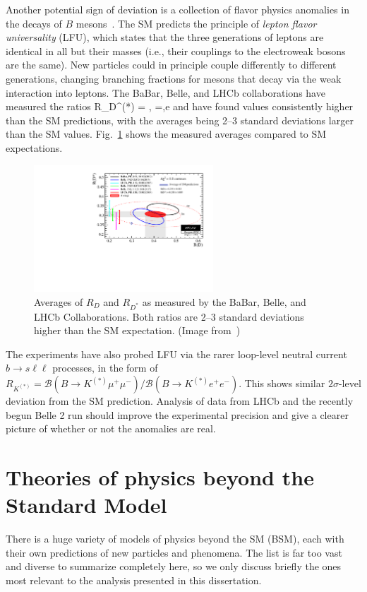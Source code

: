 Another potential sign of deviation is a collection of flavor physics anomalies in the decays of $B$ mesons~\cite{Graverini:flavour}. 
The SM predicts the principle of
\textit{lepton flavor universality} (LFU), which states that the three generations of leptons are identical in all but
their  masses (i.e., their couplings to the electroweak bosons are the same). New particles could in principle
couple differently to different generations, changing branching fractions for mesons that decay via
the weak interaction into leptons. The BaBar, Belle, and LHCb collaborations have measured the ratios
\be
R_{D^{(*)}} = , \;\;\;\;\;
 \ell=\mu,e
\ee
and have found values consistently higher than the SM predictions, with the averages being 2--3 standard deviations
larger than the SM values. Fig.~\ref{fig:b_anomalies} shows the measured averages compared to SM expectations.

\begin{figure}[t]
  \centering
  \includegraphics[width=0.6\textwidth]{figs/theory/b_anomalies.pdf}
  \caption{Averages of $R_D$ and $R_{D^*}$ as measured by the BaBar, Belle, and LHCb Collaborations.
    Both ratios are 2--3 standard deviations higher than the SM expectation. (Image from~\cite{HFLAV})
            }
    \label{fig:b_anomalies}
\end{figure}

The experiments have also probed LFU via the rarer loop-level neutral current $b\to s\ell\ell$ processes,
in the form of $R_{K^{(*)}} = \mathcal{B}(B\to K^{(*)}\mu^+\mu^-) / \mathcal{B}(B\to K^{(*)}e^+e^-)$. This shows similar
$2\sigma$-level deviation from the SM prediction. Analysis of data from LHCb and the recently begun Belle 2 run
should improve the experimental precision and give a clearer picture of whether or not the anomalies are real.

\section{Theories of physics beyond the Standard Model}
\label{sec:bsm}
There is a huge variety of models of physics beyond the SM (BSM), each with their own predictions of new particles
and phenomena. The list is far too vast and diverse to summarize completely here, so we only discuss briefly the ones most
relevant to the analysis presented in this dissertation.

